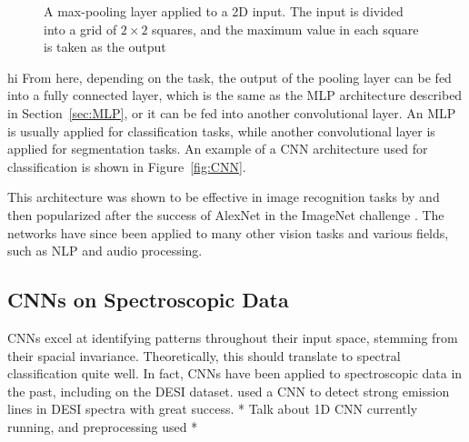 \begin{figure}
    \centering 
    
    \caption{A max-pooling layer applied to a 2D input. The input is divided into
        a grid of $2 \times 2$ squares, and the maximum value in each square is 
        taken as the output}
    \label{fig:maxpool}
\end{figure}
hi
From here, depending on the task, the output of the pooling layer can be fed
into a fully connected layer, which is the same as the MLP architecture described
in Section~\ref{sec:MLP}, or it can be fed into another convolutional layer. An
MLP is usually applied for classification tasks, while another convolutional layer
is applied for segmentation tasks. An example of a CNN architecture used for 
classification is shown in Figure~\ref{fig:CNN}.


This architecture was shown to be effective in image recognition tasks by
\textcite{lecun2004} and then popularized after the success of AlexNet in the 
ImageNet challenge \textcite{krizhevsky2012}. The networks have since been applied to
many other vision tasks and various fields, such as NLP and audio processing. 

\subsection{CNNs on Spectroscopic Data}
\label{sec:CNNspectra}
CNNs excel at identifying patterns throughout their input space, stemming from their spacial invariance. Theoretically, this should translate to spectral classification quite well. In fact, CNNs have been applied 
to spectroscopic data in the past, including on the DESI dataset. 
\textcite{parks2018} used a CNN to detect strong emission lines in DESI spectra with 
great success. * Talk about 1D CNN currently running, and preprocessing used *

